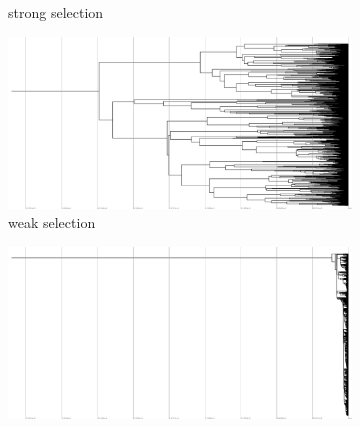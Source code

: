 \begin{figure}
\begin{subfigure}[b]{1\columnwidth}
    \caption{%
      strong selection}
  \end{subfigure}
  \hfill
  \begin{subfigure}[b]{1\columnwidth}
    \includegraphics[height=0.12\textheight,width=\textwidth]{img/perfect-tree-phylogenies-log/epoch=7+resolution=3+treatment=14/a=collapsed-phylogeny+epoch=00007+mut_distn=np.random.standard_normal+num_generations=32768+num_islands=1+num_niches=1+p_island_migration=0.01+p_niche_invasion=3.0517578125e-08+population_size=32768+r.../eplicate=0+tournament_size=1+treatment=14+_generation=262144+_index=14+scale=log+ext=.pdf}
    \caption{%
      weak selection}
  \end{subfigure}
  \hfill
  \begin{subfigure}[b]{1\columnwidth}
    \centering
    \includegraphics[height=0.12\textheight,width=\textwidth]{img/perfect-tree-phylogenies-log/epoch=7+resolution=3+treatment=8/a=collapsed-phylogeny+epoch=00007+mut_distn=np.random.standard_normal+num_generations=32768+num_islands=1+num_niches=1+p_island_migration=0.01+p_niche_invasion=3.0517578125e-08+population_size=32768+r.../eplicate=0+tournament_size=2+treatment=8+_generation=262144+_index=8+scale=log+ext=.pdf}

\end{subfigure}
\end{figure}
